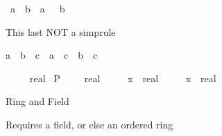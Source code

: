 \begin{isabellebody}
\begin{isamarkuptext}
\begin{isabelle}%
{\isacharminus}\ {\isacharparenleft}a\ {\isacharslash}\ b{\isacharparenright}\ {\isacharequal}\ a\ {\isacharslash}\ {\isacharminus}\ b%
\end{isabelle}

This last NOT a simprule

\begin{isabelle}%
{\isacharparenleft}a\ {\isacharplus}\ b{\isacharparenright}\ {\isacharslash}\ c\ {\isacharequal}\ a\ {\isacharslash}\ c\ {\isacharplus}\ b\ {\isacharslash}\ c%
\end{isabelle}
%
\end{isamarkuptext}%
\isamarkuptrue%
\ {\isachardoublequote}{}{\isacharslash}{}\ {\isacharless}\ {\isacharparenleft}{}{\isacharslash}{}\ {\isacharcolon}{\isacharcolon}\ real{\isacharparenright}{\isachardoublequote}\isanewline
\isamarkupfalse%
\isanewline
\isamarkupfalse%
\ {\isachardoublequote}P\ {\isacharparenleft}{\isacharparenleft}{}{\isacharslash}{}{\isacharparenright}\ {\isacharasterisk}\ {\isacharparenleft}{}{\isacharslash}{}{}\ {\isacharcolon}{\isacharcolon}\ real{\isacharparenright}{\isacharparenright}{\isachardoublequote}\isamarkupfalse%
\isamarkuptrue%
\isamarkupfalse%
\isamarkuptrue%
\isanewline
\isanewline
\isamarkupfalse%
\ {\isachardoublequote}{\isacharparenleft}{}{\isacharslash}{}{\isacharparenright}\ {\isacharasterisk}\ {\isacharparenleft}{}{\isacharslash}{}{}{\isacharparenright}\ {\isacharless}\ {\isacharparenleft}x\ {\isacharcolon}{\isacharcolon}\ real{\isacharparenright}{\isachardoublequote}\isamarkupfalse%
\isamarkuptrue%
\isamarkupfalse%
\isamarkuptrue%
\isanewline
\isanewline
\isamarkupfalse%
\ {\isachardoublequote}{\isacharparenleft}{}{\isacharslash}{}{\isacharparenright}\ {\isacharasterisk}\ {\isacharparenleft}{}{}{\isacharcircum}{}{}{\isacharparenright}\ {\isacharless}\ {\isacharparenleft}x\ {\isacharcolon}{\isacharcolon}\ real{\isacharparenright}{\isachardoublequote}\isanewline
\isamarkupfalse%
\isamarkupfalse%
\isamarkupfalse%
%
\begin{isamarkuptext}%
Ring and Field

Requires a field, or else an ordered ring


\end{isamarkuptext}
\end{isabellebody}
